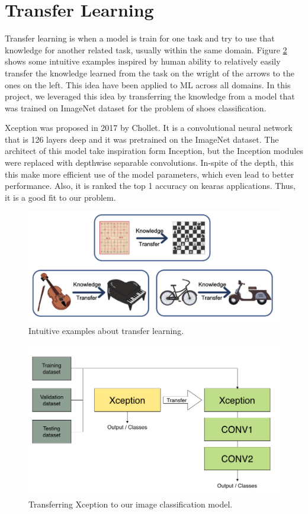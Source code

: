 \section{Transfer Learning}

Transfer learning is when a model is train for one task and try to use that knowledge for another related task, usually within the same domain.  Figure \ref{fig:transfer} shows some intuitive examples inspired by human ability to relatively easily transfer the knowledge learned from the task on the wright of the arrows to the ones on the left. This idea have been applied to ML across all domains. In this project, we leveraged this idea by transferring the knowledge from a model that was trained on ImageNet dataset for the problem of shoes classification.

Xception \cite{chollet2017xception} was proposed in 2017 by Chollet. It is a convolutional neural network that is 126 layers deep and it was pretrained on the ImageNet dataset. The architect of this model take inspiration form Inception, but the Inception modules were replaced with depthwise separable convolutions. In-spite of the depth, this this make more efficient use of the model parameters, which even lead to better performance. Also, it is ranked the top 1 accuracy on kearas applications. Thus, it is a good fit to our problem. 

\begin{figure}[h]
  \centering
  \includegraphics[width=\linewidth]{figs/transfer_learning.png}
  \caption{Intuitive examples about transfer learning.}
  \label{fig:transfer}
\end{figure}

\begin{figure}[h]
  \centering
  \includegraphics[width=\linewidth]{figs/xception.png}
  \caption{Transferring Xception to our image classification model.}
  \label{fig:transfer}
\end{figure}